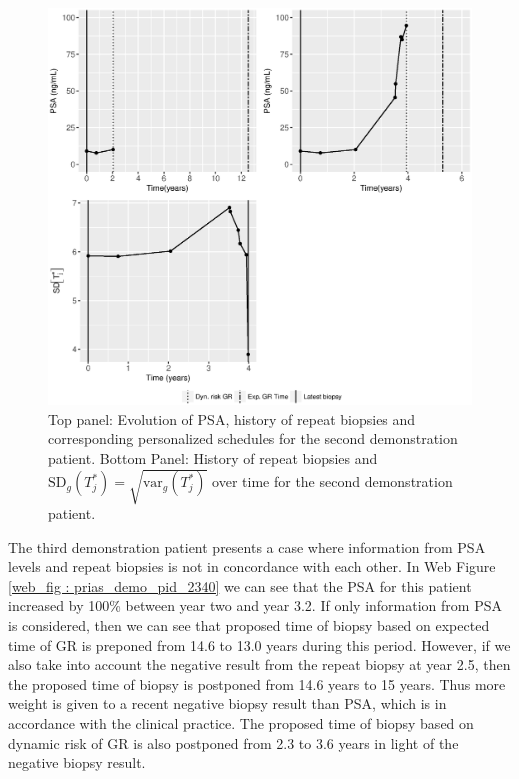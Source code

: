 \begin{figure}
\centerline{\includegraphics[width=\columnwidth]{images/prias_demo/case_3174.eps}}
\caption{Top panel: Evolution of PSA, history of repeat biopsies and corresponding personalized schedules for the second demonstration patient. Bottom Panel: History of repeat biopsies and $\mbox{SD}_g(T^*_j) = \sqrt{\mbox{var}_g(T^*_j)}$ over time for the second demonstration patient.}
\label{fig : prias_demo_pid_3174}
\end{figure}

\clearpage

The third demonstration patient presents a case where information from PSA levels and repeat biopsies is not in concordance with each other. In Web Figure \ref{web_fig : prias_demo_pid_2340} we can see that the PSA for this patient increased by 100\% between year two and year 3.2. If only information from PSA is considered, then we can see that proposed time of biopsy based on expected time of GR is preponed from 14.6 to 13.0 years during this period. However, if we also take into account the negative result from the repeat biopsy at year 2.5, then the proposed time of biopsy is postponed from 14.6 years to 15 years. Thus more weight is given to a recent negative biopsy result than PSA, which is in accordance with the clinical practice. The proposed time of biopsy based on dynamic risk of GR is also postponed from 2.3 to 3.6 years in light of the negative biopsy result.

